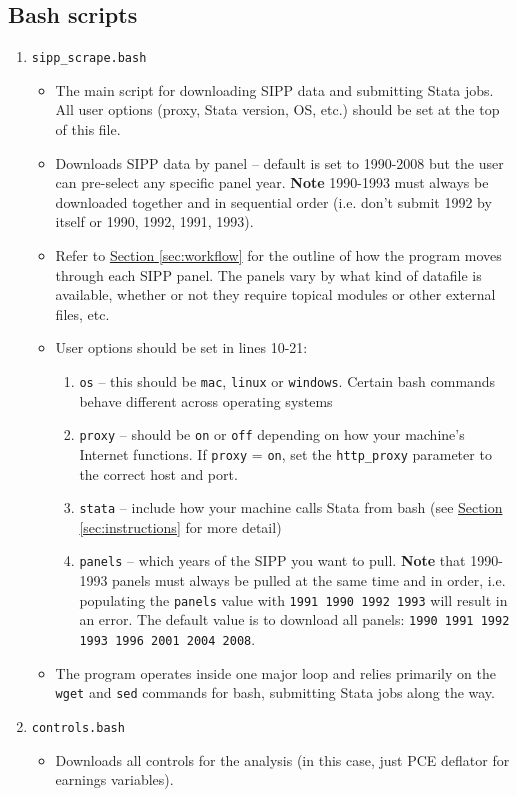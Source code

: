 \documentclass{article}
\begin{document}
\subsection{Bash scripts}
\begin{enumerate}
\item {\tt sipp\_scrape.bash}
	\begin{itemize}
	\item The main script for downloading SIPP data and submitting Stata jobs. All user options (proxy, Stata version, OS, etc.) should be set at the top of this file.
	\item Downloads SIPP data by panel -- default is set to 1990-2008 but the user can pre-select any specific panel year. {\bf Note} 1990-1993 must always be downloaded together 			and in sequential order (i.e. don't submit 1992 by itself or 1990, 1992, 1991, 1993).
	\item Refer to \hyperref[sec:workflow]{Section \ref*{sec:workflow}} for the outline of how the program moves through each SIPP panel. The panels vary by what kind of datafile is available, whether or not 			they require topical modules or other external files, etc. 
	\item User options should be set in lines 10-21:
		\begin{enumerate}
		\item {\tt os} -- this should be {\tt mac}, {\tt linux} or {\tt windows}. Certain bash commands behave different across operating systems
		\item {\tt proxy} -- should be {\tt on} or {\tt off} depending on how your machine's Internet functions. If {\tt proxy} = {\tt on}, set the {\tt http\_proxy} parameter to the correct host and port.
		\item {\tt stata} -- include how your machine calls Stata from bash (see \hyperref[sec:instructions]{Section \ref*{sec:instructions}} for more detail)
		\item {\tt panels} -- which years of the SIPP you want to pull. {\bf Note} that 1990-1993 panels must always be pulled at the same time and in order, i.e. populating the {\tt panels} value with {\tt 1991 1990 1992 1993} will result in an error. The default value is to download all panels: {\tt 1990 1991 1992 1993 1996 2001 2004 2008}.
		\end{enumerate}
	\item The program operates inside one major loop and relies primarily on the {\tt wget} and {\tt sed} commands for bash, submitting Stata jobs along the way.
	\end{itemize}
\item {\tt controls.bash}
	\begin{itemize}
	\item Downloads all controls for the analysis  (in this case, just PCE deflator for earnings variables).
	\end{itemize}

\end{enumerate}
\end{document}
